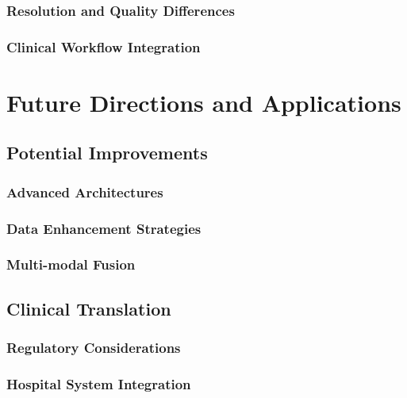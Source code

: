 \documentclass[12pt,a4paper]{report}
\begin{document}
\subsection{Resolution and Quality Differences}

\subsection{Clinical Workflow Integration}

\chapter{Future Directions and Applications}

\section{Potential Improvements}

\subsection{Advanced Architectures}

\subsection{Data Enhancement Strategies}

\subsection{Multi-modal Fusion}

\section{Clinical Translation}

\subsection{Regulatory Considerations}

\subsection{Hospital System Integration}
\end{document}
